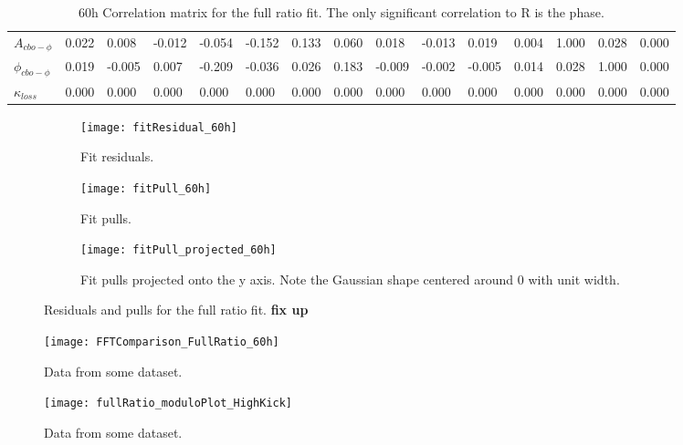 \begin{landscape}
\begin{table}[]
\begin{tabular*}{\linewidth}{@{\extracolsep{\fill}}lLBLLLLLLLLLLLL}
$A_{cbo-\phi}$     & 0.022 & 0.008 & -0.012 & -0.054 & -0.152 & 0.133 & 0.060 & 0.018 & -0.013 & 0.019 & 0.004 & 1.000 & 0.028 & 0.000  \\
$\phi_{cbo-\phi}$  & 0.019 & -0.005 & 0.007 & -0.209 & -0.036 & 0.026 & 0.183 & -0.009 & -0.002 & -0.005 & 0.014 & 0.028 & 1.000 & 0.000  \\
$\kappa_{loss}$    & 0.000 & 0.000 & 0.000 & 0.000 & 0.000 & 0.000 & 0.000 & 0.000 & 0.000 & 0.000 & 0.000 & 0.000 & 0.000 & 0.000  \\
  \bottomrule
\end{tabular*}
\caption[]{60h Correlation matrix for the full ratio fit. The only significant correlation to R is the \gmtwo phase.}
\label{Tab:CorrMat}
\end{table}
\end{landscape}


    \begin{figure}[h]
    \centering
        \begin{subfigure}[]{0.45\textwidth}
            \centering
            \texttt{[image: fitResidual\_60h]}
            \caption{Fit residuals.}
        \end{subfigure}
        \begin{subfigure}[]{0.45\textwidth}
            \centering
            \texttt{[image: fitPull\_60h]}
            \caption{Fit pulls.}
        \end{subfigure}%
        \vspace{4mm}
        \begin{subfigure}[]{0.7\textwidth}
            \centering
            \texttt{[image: fitPull\_projected\_60h]}
            \caption{Fit pulls projected onto the y axis. Note the Gaussian shape centered around 0 with unit width.}
        \end{subfigure}
    \caption[fitResidual]{Residuals and pulls for the full ratio fit. \textbf{fix up}}
    \label{fig:fitResidual}
    \end{figure}


\begin{figure}[]
    \centering
    \texttt{[image: FFTComparison\_FullRatio\_60h]}
    \caption[]{Data from some dataset.}
    \label{fig:}
\end{figure}



\begin{figure}[]
    \centering
    \texttt{[image: fullRatio\_moduloPlot\_HighKick]}
    \caption[]{Data from some dataset.}
    \label{fig:}
\end{figure}

